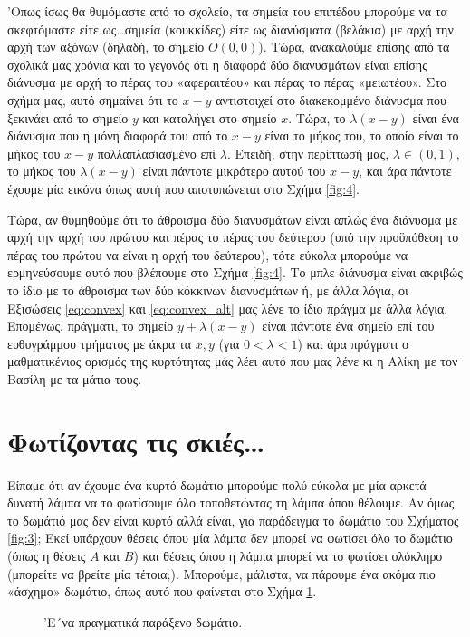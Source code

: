 \documentclass[11pt,a4paper]{article}
\theoremstyle{definition}
\begin{document}
	'Οπως ίσως θα θυμόμαστε από το σχολείο, τα σημεία του επιπέδου μπορούμε να τα σκεφτόμαστε είτε ως\ldots σημεία (κουκκίδες) είτε ως διανύσματα (βελάκια) με αρχή την αρχή των αξόνων (δηλαδή, το σημείο $O(0,0)$). Τώρα, ανακαλούμε επίσης από τα σχολικά μας χρόνια και το γεγονός ότι η διαφορά δύο διανυσμάτων είναι επίσης διάνυσμα με αρχή το πέρας του «αφεραιτέου» και πέρας το πέρας «μειωτέου». Στο σχήμα μας, αυτό σημαίνει ότι το $x-y$ αντιστοιχεί στο διακεκομμένο διάνυσμα που ξεκινάει από το σημείο $y$ και καταλήγει στο σημείο $x$. Τώρα, το $\lambda(x-y)$ είναι ένα διάνυσμα που η μόνη διαφορά του από το $x-y$ είναι το μήκος του, το οποίο είναι το μήκος του $x-y$ πολλαπλασιασμένο επί $\lambda$. Επειδή, στην περίπτωσή μας, $\lambda\in(0,1)$, το μήκος του $\lambda(x-y)$ είναι πάντοτε μικρότερο αυτού του $x-y$, και άρα πάντοτε έχουμε μία εικόνα όπως αυτή που αποτυπώνεται στο Σχήμα \ref{fig:4}.
	
	Τώρα, αν θυμηθούμε ότι το άθροισμα δύο διανυσμάτων είναι απλώς ένα διάνυσμα με αρχή την αρχή του πρώτου και πέρας το πέρας του δεύτερου (υπό την προϋπόθεση το πέρας του πρώτου να είναι η αρχή του δεύτερου), τότε εύκολα μπορούμε να ερμηνεύσουμε αυτό που βλέπουμε στο Σχήμα \ref{fig:4}. Το μπλε διάνυσμα είναι ακριβώς το ίδιο με το άθροισμα των δύο κόκκινων διανυσμάτων ή, με άλλα λόγια, οι Εξισώσεις \eqref{eq:convex} και \eqref{eq:convex_alt} μας λένε το ίδιο πράγμα με άλλα λόγια. Επομένως, πράγματι, το σημείο $y+\lambda(x-y)$ είναι πάντοτε ένα σημείο επί του ευθυγράμμου τμήματος με άκρα τα $x,y$ (για $0<\lambda<1$) και άρα πράγματι ο μαθματικένιος ορισμός της κυρτότητας μάς λέει αυτό που μας λένε κι η Αλίκη με τον Βασίλη με τα μάτια τους.
	
	\section{Φωτίζοντας τις σκιές\ldots}
	Είπαμε ότι αν έχουμε ένα κυρτό δωμάτιο μπορούμε πολύ εύκολα με μία αρκετά δυνατή λάμπα να το φωτίσουμε όλο τοποθετώντας τη λάμπα όπου θέλουμε. Αν όμως το δωμάτιό μας δεν είναι κυρτό αλλά είναι, για παράδειγμα το δωμάτιο του Σχήματος \ref{fig:3}; Εκεί υπάρχουν θέσεις όπου μία λάμπα δεν μπορεί να φωτίσει όλο το δωμάτιο (όπως η θέσεις $A$ και $B$) και θέσεις όπου η λάμπα μπορεί να το φωτίσει ολόκληρο (μπορείτε να βρείτε μία τέτοια;). Μπορούμε, μάλιστα, να πάρουμε ένα ακόμα πιο «άσχημο» δωμάτιο, όπως αυτό που φαίνεται στο Σχήμα \ref{fig:5}.
	
	\begin{figure}[!htb]
		\centering
		\caption{'Ε´να πραγματικά παράξενο δωμάτιο.}
		\label{fig:5}
	\end{figure}
	
\end{document}
